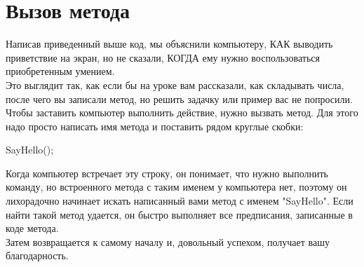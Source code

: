 \documentclass[12pt, a4paper]{article}
\begin{document}
\section{Вызов метода}
Написав приведенный выше код, мы объяснили компьютеру, КАК выводить приветствие на экран, но не сказали, КОГДА ему нужно воспользоваться приобретенным умением.\\

Это выглядит так, как если бы на уроке вам рассказали, как складывать числа, после чего вы записали метод, но решить задачку или пример вас не попросили.\\

Чтобы заставить компьютер выполнить действие, нужно вызвать метод. Для этого надо просто написать имя метода и поставить рядом круглые скобки:\\

\begin{spverbatim}SayHello();\end{spverbatim}

Когда компьютер встречает эту строку, он понимает, что нужно выполнить команду, но встроенного метода с таким именем у компьютера нет, поэтому он лихорадочно начинает искать написанный вами метод с именем "SayHello". Если найти такой метод удается, он быстро выполняет все предписания, записанные в коде метода.\\

Затем возвращается к самому началу и, довольный успехом, получает вашу благодарность.\\
\end{document}
